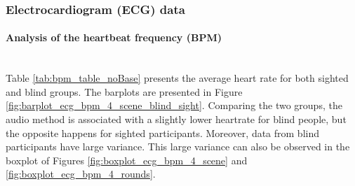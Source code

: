 \subsubsection{Electrocardiogram (ECG) data}
\label{subsubsec:results_ecg_2}

\paragraph{Analysis of the heartbeat frequency (BPM)}\mbox{}\\

Table \ref{tab:bpm_table_noBase} presents the average heart rate for both sighted and blind groups. The barplots are presented in Figure \ref{fig:barplot_ecg_bpm_4_scene_blind_sight}. Comparing the two groups, the audio method is associated with a slightly lower heartrate for blind people, but the opposite happens for sighted participants. Moreover, data from blind participants have large variance. This large variance can also be observed in the boxplot of Figures \ref{fig:boxplot_ecg_bpm_4_scene} and \ref{fig:boxplot_ecg_bpm_4_rounds}. 



